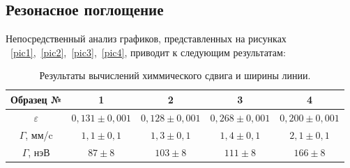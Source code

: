 \documentclass[a4paper,12pt]{article} %
\begin{document}
	\subsection{Резонасное поглощение}
		Непосредственный анализ графиков, представленных на рисунках ~\ref{pic1},~\ref{pic2},~\ref{pic3},~\ref{pic4}, приводит к следующим результатам:
		\begin{table}[H]
			\caption{Результаты вычислений химмического сдвига и ширины линии.}
			\label{table:results}
			\begin{tabular}{|c|c|c|c|c|}
				\hline
				Образец №      & 1                 & 2                 & 3                 & 4                 \\ \hline
				$\varepsilon$  & $0,131 \pm 0,001$ & $0,128 \pm 0,001$ & $0,268 \pm 0,001$ & $0,200 \pm 0,001$ \\ \hline
				$\Gamma$, мм/c & $1,1 \pm 0,1$     & $1,3 \pm 0,1$     & $1,4 \pm 0,1$     & $2,1 \pm 0,1$     \\ \hline
				$\Gamma$, нэВ  & $87 \pm 8$        & $103 \pm 8$       & $111 \pm 8$       & $166 \pm 8$       \\ \hline
			\end{tabular}
		\end{table}
		
\end{document}
